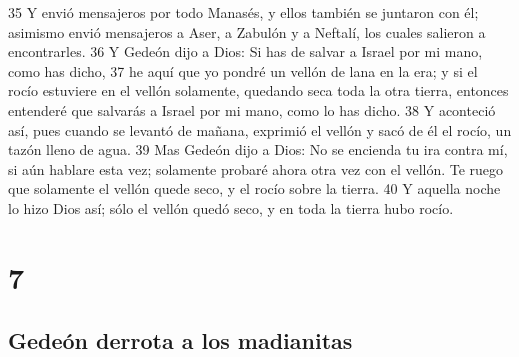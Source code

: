 35 Y envió mensajeros por todo Manasés, y ellos también se juntaron con él; asimismo envió mensajeros a Aser, a Zabulón y a Neftalí, los cuales salieron a encontrarles.
36 Y Gedeón dijo a Dios: Si has de salvar a Israel por mi mano, como has dicho,
37 he aquí que yo pondré un vellón de lana en la era; y si el rocío estuviere en el vellón solamente, quedando seca toda la otra tierra, entonces entenderé que salvarás a Israel por mi mano, como lo has dicho.
38 Y aconteció así, pues cuando se levantó de mañana, exprimió el vellón y sacó de él el rocío, un tazón lleno de agua.
39 Mas Gedeón dijo a Dios: No se encienda tu ira contra mí, si aún hablare esta vez; solamente probaré ahora otra vez con el vellón. Te ruego que solamente el vellón quede seco, y el rocío sobre la tierra.
40 Y aquella noche lo hizo Dios así; sólo el vellón quedó seco, y en toda la tierra hubo rocío.

\chapter{7}

\section*{Gedeón derrota a los madianitas}

